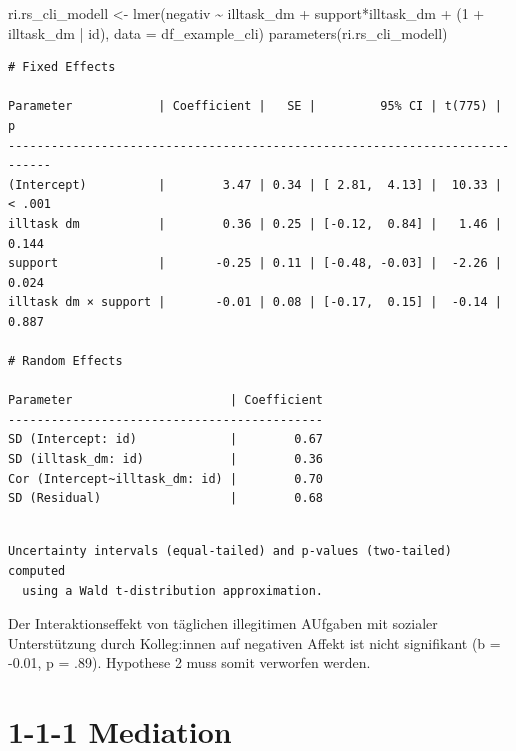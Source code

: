 \documentclass[
  letterpaper,
  DIV=11,
  numbers=noendperiod]{scrreprt}
\newenvironment{Shaded}{\begin{snugshade}}{\end{snugshade}}
\newcommand{\AttributeTok}[1]{\textcolor[rgb]{0.40,0.45,0.13}{#1}}
\newcommand{\DecValTok}[1]{\textcolor[rgb]{0.68,0.00,0.00}{#1}}
\newcommand{\FunctionTok}[1]{\textcolor[rgb]{0.28,0.35,0.67}{#1}}
\newcommand{\NormalTok}[1]{\textcolor[rgb]{0.00,0.23,0.31}{#1}}
\newcommand{\OtherTok}[1]{\textcolor[rgb]{0.00,0.23,0.31}{#1}}
\newcommand{\SpecialCharTok}[1]{\textcolor[rgb]{0.37,0.37,0.37}{#1}}
\begin{document}
\begin{tcolorbox}
\begin{Shaded}
\begin{Highlighting}[]
\NormalTok{ri.rs\_cli\_modell }\OtherTok{\textless{}{-}} \FunctionTok{lmer}\NormalTok{(negativ }\SpecialCharTok{\textasciitilde{}}\NormalTok{ illtask\_dm  }\SpecialCharTok{+}\NormalTok{ support}\SpecialCharTok{*}\NormalTok{illtask\_dm }\SpecialCharTok{+}\NormalTok{ (}\DecValTok{1} \SpecialCharTok{+}\NormalTok{ illtask\_dm }\SpecialCharTok{|}\NormalTok{ id), }\AttributeTok{data =}\NormalTok{ df\_example\_cli)}
\FunctionTok{parameters}\NormalTok{(ri.rs\_cli\_modell)}
\end{Highlighting}
\end{Shaded}

\begin{verbatim}
# Fixed Effects

Parameter            | Coefficient |   SE |         95% CI | t(775) |      p
----------------------------------------------------------------------------
(Intercept)          |        3.47 | 0.34 | [ 2.81,  4.13] |  10.33 | < .001
illtask dm           |        0.36 | 0.25 | [-0.12,  0.84] |   1.46 | 0.144 
support              |       -0.25 | 0.11 | [-0.48, -0.03] |  -2.26 | 0.024 
illtask dm × support |       -0.01 | 0.08 | [-0.17,  0.15] |  -0.14 | 0.887 

# Random Effects

Parameter                      | Coefficient
--------------------------------------------
SD (Intercept: id)             |        0.67
SD (illtask_dm: id)            |        0.36
Cor (Intercept~illtask_dm: id) |        0.70
SD (Residual)                  |        0.68
\end{verbatim}

\begin{verbatim}

Uncertainty intervals (equal-tailed) and p-values (two-tailed) computed
  using a Wald t-distribution approximation.
\end{verbatim}

Der Interaktionseffekt von täglichen illegitimen AUfgaben mit sozialer
Unterstützung durch Kolleg:innen auf negativen Affekt ist nicht
signifikant (b = -0.01, p = .89). Hypothese 2 muss somit verworfen
werden.

\end{tcolorbox}

\section{1-1-1 Mediation}\label{mediation}
\end{document}
